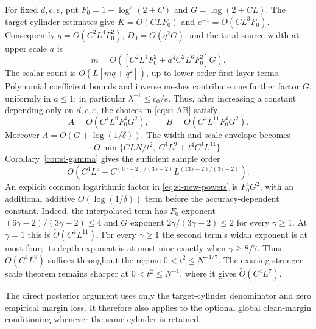 For fixed $d,c,\varepsilon$, put
$F_0=1+\log^2(2+C)$ and $G=\log(2+CL)$.
The target-cylinder estimates give
$K=O(CLF_0)$ and $e^{-1}=O(CL^3F_0)$.
Consequently $q=O(C^2L^4F_0^2)$,
$D_0=O(q^2G)$, and the total source width at upper scale $a$ is
\[
 m=O\left([C^2L^4F_0^2+a^4C^2L^6F_0^2]G\right).
\]
The scalar count is $O(L[mq+q^2])$, up to lower-order first-layer
terms. Polynomial coefficient bounds and inverse meshes contribute one
further factor $G$, uniformly in $a\le1$: in particular
$\lambda^{-1}\le c_0/e$. Thus, after increasing a constant depending
only on $d,c,\varepsilon$, the choices in \eqref{eq:si-AB} satisfy
\begin{equation}\label{eq:si-resources}
 A=O(C^4L^9F_0^4G^2),\qquad
 B=O(C^4L^{11}F_0^4G^2).
\end{equation}
Moreover $\Lambda=O(G+\log(1/\delta))$.
The width and scale envelope becomes
\[
 \widetilde O\min\{CLN/t^2,\ C^4L^9+t^4C^4L^{11}\}.
\]
Corollary~\ref{cor:si-gamma} gives the sufficient sample order
\begin{equation}\label{eq:si-new-powers}
 \widetilde O\left(
 C^4L^9+
 C^{(6\gamma-2)/(3\gamma-2)}
 L^{(13\gamma-2)/(3\gamma-2)}\right).
\end{equation}
An explicit common logarithmic factor in \eqref{eq:si-new-powers} is
$F_0^4G^2$, with an additional additive $O(\log(1/\delta))$ term
before the accuracy-dependent constant. Indeed, the interpolated term
has $F_0$ exponent $(6\gamma-2)/(3\gamma-2)\le4$ and $G$ exponent
$2\gamma/(3\gamma-2)\le2$ for every $\gamma\ge1$.
At $\gamma=1$ this is $\widetilde O(C^4L^{11})$.
For every $\gamma\ge1$ the second term's width exponent is at most four;
its depth exponent is at most nine exactly when $\gamma\ge8/7$.
Thus $\widetilde O(C^4L^9)$ suffices throughout the regime
$0<t^2\le N^{-1/7}$. The existing stronger-scale theorem remains
sharper at $0<t^2\le N^{-1}$, where it gives
$\widetilde O(C^4L^7)$.

The direct posterior argument uses only the target-cylinder denominator
and zero empirical margin loss. It therefore also applies to the optional
global clean-margin conditioning whenever the same cylinder is retained.
